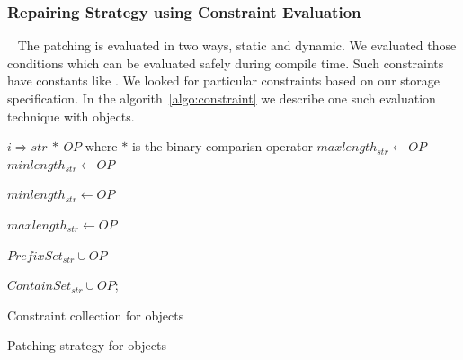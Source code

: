 \subsubsection{Repairing Strategy using Constraint Evaluation}
\label{subsubsec:repairingStrategyConstraint}

~\newline
The patching is evaluated in two ways, static and dynamic. We evaluated those
conditions which can be evaluated safely during compile time. Such constraints
have constants like . We looked for particular
constraints based on our storage specification. In the algorith~\ref{algo:constraint}
we describe one such evaluation technique with  objects.

\begin{algorithm}
\scriptsize
\DontPrintSemicolon
{}
\Begin
{ 
  {
   $i \Rightarrow str\ *\ OP$\;
   where $*$ is the binary comparisn operator\;
   {
    $maxlength_{str} \longleftarrow OP$\;
    $minlength_{str} \longleftarrow OP$\;
   }
   
   {
    $minlength_{str} \longleftarrow OP$\;
   }
   
   {
    $maxlength_{str} \longleftarrow OP$\;
   }
   
   {
    $PrefixSet_{str} \cup OP$\;
   }
   
   {
    $ContainSet_{str} \cup OP$;
   }
  }
}
\caption{Constraint collection for  objects}
 \label{algo:constraintCollection}
\end{algorithm}

\begin{algorithm}
\scriptsize
\DontPrintSemicolon
{}
\Begin
{ 
 
}
\caption{Patching strategy for  objects}
 \label{algo:patchingStrategy}
\end{algorithm}